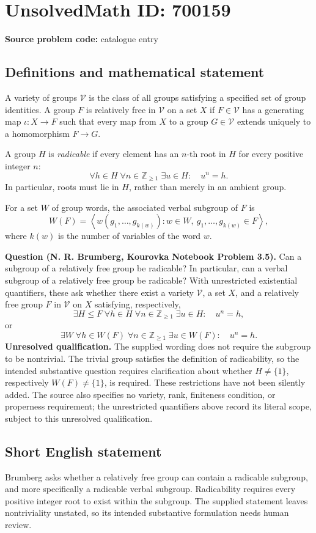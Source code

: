 \documentclass[11pt]{article}
\newcommand{\Z}{\mathbb{Z}}
\begin{document}
\section*{UnsolvedMath ID: 700159}
\textbf{Source problem code:} catalogue entry
\subsection{Definitions and mathematical statement}
A variety of groups \(\mathcal V\) is the class of all groups satisfying a specified set of group identities. A group \(F\) is relatively free in \(\mathcal V\) on a set \(X\) if \(F\in\mathcal V\) has a generating map \(\iota:X\to F\) such that every map from \(X\) to a group \(G\in\mathcal V\) extends uniquely to a homomorphism \(F\to G\).

A group \(H\) is \emph{radicable} if every element has an \(n\)-th root in \(H\) for every positive integer \(n\):
\[
\forall h\in H\;\forall n\in\Z_{\geq 1}\;\exists u\in H:\quad u^n=h.
\]
In particular, roots must lie in \(H\), rather than merely in an ambient group.

For a set \(W\) of group words, the associated verbal subgroup of \(F\) is
\[
W(F)=\left\langle w(g_1,\ldots,g_{k(w)}):w\in W,\ g_1,\ldots,g_{k(w)}\in F\right\rangle,
\]
where \(k(w)\) is the number of variables of the word \(w\).

\textbf{Question (N. R. Brumberg, Kourovka Notebook Problem 3.5).} Can a subgroup of a relatively free group be radicable? In particular, can a verbal subgroup of a relatively free group be radicable? With unrestricted existential quantifiers, these ask whether there exist a variety \(\mathcal V\), a set \(X\), and a relatively free group \(F\) in \(\mathcal V\) on \(X\) satisfying, respectively,
\[
\exists H\leq F\;\forall h\in H\;\forall n\in\Z_{\geq1}\;\exists u\in H:\quad u^n=h,
\]
or
\[
\exists W\;\forall h\in W(F)\;\forall n\in\Z_{\geq1}\;\exists u\in W(F):\quad u^n=h.
\]
\textbf{Unresolved qualification.} The supplied wording does not require the subgroup to be nontrivial. The trivial group satisfies the definition of radicability, so the intended substantive question requires clarification about whether \(H\ne\{1\}\), respectively \(W(F)\ne\{1\}\), is required. These restrictions have not been silently added. The source also specifies no variety, rank, finiteness condition, or properness requirement; the unrestricted quantifiers above record its literal scope, subject to this unresolved qualification.
\subsection{Short English statement}
Brumberg asks whether a relatively free group can contain a radicable subgroup, and more specifically a radicable verbal subgroup. Radicability requires every positive integer root to exist within the subgroup. The supplied statement leaves nontriviality unstated, so its intended substantive formulation needs human review.
\end{document}
